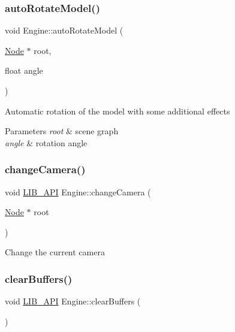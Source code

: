 \subsubsection{\texorpdfstring{auto\+Rotate\+Model()}{autoRotateModel()}}
{\footnotesize\ttfamily void Engine\+::auto\+Rotate\+Model (\begin{DoxyParamCaption}\item[{\hyperlink{classNode}{Node} $\ast$}]{root,  }\item[{float}]{angle }\end{DoxyParamCaption})}

Automatic rotation of the model with some additional effects 
\begin{DoxyParams}{Parameters}
{\em root} & scene graph \\
\hline
{\em angle} & rotation angle \\
\hline
\end{DoxyParams}
\mbox{\label{classEngine_a9c29390e49cea40900a48490c8659490}} 
\subsubsection{\texorpdfstring{change\+Camera()}{changeCamera()}}
{\footnotesize\ttfamily void \hyperlink{Engine_8h_a77278c8cc96e39fb27b5d0a347c8fb3d}{L\+I\+B\+\_\+\+A\+PI} Engine\+::change\+Camera (\begin{DoxyParamCaption}\item[{\hyperlink{classNode}{Node} $\ast$}]{root }\end{DoxyParamCaption})}

Change the current camera \mbox{\label{classEngine_acc1431883e68b03c4a873ffb222f55cc}} 
\subsubsection{\texorpdfstring{clear\+Buffers()}{clearBuffers()}}
{\footnotesize\ttfamily void \hyperlink{Engine_8h_a77278c8cc96e39fb27b5d0a347c8fb3d}{L\+I\+B\+\_\+\+A\+PI} Engine\+::clear\+Buffers (\begin{DoxyParamCaption}{ }\end{DoxyParamCaption})}

